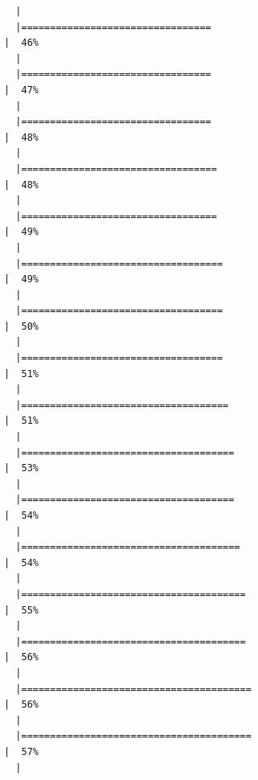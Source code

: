 \documentclass[
  letterpaper,
  DIV=11,
  numbers=noendperiod]{scrreprt}
\begin{document}
\begin{verbatim}
  |                                                                            
  |=================================                                     |  46%
  |                                                                            
  |=================================                                     |  47%
  |                                                                            
  |=================================                                     |  48%
  |                                                                            
  |==================================                                    |  48%
  |                                                                            
  |==================================                                    |  49%
  |                                                                            
  |===================================                                   |  49%
  |                                                                            
  |===================================                                   |  50%
  |                                                                            
  |===================================                                   |  51%
  |                                                                            
  |====================================                                  |  51%
  |                                                                            
  |=====================================                                 |  53%
  |                                                                            
  |=====================================                                 |  54%
  |                                                                            
  |======================================                                |  54%
  |                                                                            
  |=======================================                               |  55%
  |                                                                            
  |=======================================                               |  56%
  |                                                                            
  |========================================                              |  56%
  |                                                                            
  |========================================                              |  57%
  |                                                                            

\end{verbatim}
\end{document}
